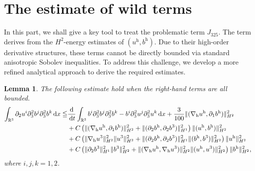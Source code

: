 \documentclass[11pt]{amsart}
\newtheorem{lem}[thm]{Lemma}
\theoremstyle{definition}
\newcommand{\R}{\mathbb{R}}
\newcommand{\h}{\mathrm{h}}
\newcommand{\dx}{\,{\rm d}x}
\newcommand{\dt}{\,{\rm d}t}
\newcommand{\nablah}{\nabla_{\mathrm{h}}}
\numberwithin{equation}{section}
\begin{document}
\appendix
\section{The estimate of wild terms}
In this part,  we shall give a key tool to treat the  problematic term $J_{325}$. The term derives from the $H^{2}$-energy estimates of  $(u^\h,b^\h)$.
Due to their high-order derivative structures, these terms cannot be directly bounded via standard anisotropic Sobolev inequalities. To address this challenge, we develop a more refined analytical approach to derive the required estimates.
\begin{lem}\label{wild}
	The following estimate hold when the right-hand terms are all bounded.
	\begin{align}\label{Esti.wild}
		\int_{\R^3}\partial_2u^i\partial_3^2b^j\partial_3^2b^k\dx\leqq&\frac{\mathrm{d}}{\dt}\int_{\R^3} b^i\partial_3^2b^j\partial_3^2b^k-b^i\partial_3^2u^j\partial_3^2u^k\dx+\frac{3}{100}\|(\nablah u^\h,\partial_1b^\h)\|_{H^2}^2\nonumber\\
		&+C\left(\|(\nablah u^\h,\partial_1b^\h)\|_{H^2}^2+\|(\partial_2b^\h,\partial_2b^3)\|_{H^1}^2\right)\|(u^\h,b^\h)\|_{H^2}^2\nonumber\\
		&+C\left(\|\nablah u^3\|_{H^2}^2\|u^3\|_{H^2}^2+ \|(\partial_2b^\h,\partial_2b^3)\|_{H^1}^2\|(b^\h,b^3)\|_{H^2}^2\right)\|u^\h\|_{H^2}^2\nonumber\\	&+C\left(\|\partial_2b^3\|_{H^1}^2\|b^3\|_{H^2}^2+\|(\nablah u^\h,\nablah u^3)\|_{H^2}^2\|(u^\h,u^3)\|_{H^2}^2\right)\|b^\h\|_{H^2}^2,
	\end{align}
	where $i,j,k=1,2$.
\end{lem}
\end{document}
